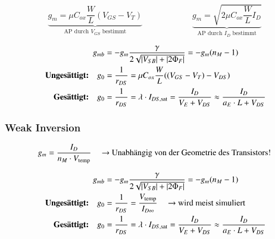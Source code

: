 \[
    \underbrace{ g_m = \mu C_{ox} \frac{W}{L} (V_{GS} - V_T) }_{\text{AP durch } V_{GS} \text{ bestimmt}} \qquad \qquad \qquad
    \underbrace{ g_m = \sqrt{2 \mu C_{ox} \frac{W}{L} I_D} }_{\text{AP durch } I_D \text{ bestimmt}} 
\]


\vspace{-0.15cm}

\begin{align*}
                                         g_{mb} &= -g_m \frac{\gamma}{2 \sqrt{\left|V_{SB}\right| + \left|2 \Phi_F\right|}} = - g_m (n_M - 1)                                     \\
    \text{ \textbf{Ungesättigt:}} \quad     g_0 &= \frac{1}{r_{DS}} = \mu C_{ox} \frac{W}{L} ((V_{GS} - V_T) - V_{DS})                                              \\
    \text{ \textbf{Gesättigt:}} \quad       g_0 &=  \frac{1}{r_{DS}} = \lambda \cdot I_{DS, \rm sat} = \frac{I_D}{V_E + V_{DS}} \approx \frac{I_D}{a_E \cdot L + V_{DS}}
\end{align*}


\subsubsection{Weak Inversion}

\vspace{-0.3cm}

\[
    g_m = \frac{I_D}{n_M \cdot V_\text{temp}} \quad \text{ \textrightarrow\ Unabhängig von der Geometrie des Transistors!}
\]


\vspace{-0.15cm}

\begin{align*}
                                         g_{mb} &= -g_m \frac{\gamma}{2 \sqrt{\abs{V_{SB}} + \abs{2 \Phi_F}}} = - g_m (n_M - 1)                                             \\
    \text{ \textbf{Ungesättigt:}} \quad     g_0 &= \frac{1}{r_{DS}} = \frac{V_{\text{temp}}}{I_{D \infty}} \quad \text{ \textrightarrow\ wird meist simuliert}              \\
    \text{ \textbf{Gesättigt:}} \quad       g_0 &=  \frac{1}{r_{DS}} = \lambda \cdot  I_{DS, \rm sat} = \frac{I_D}{V_E + V_{DS}}  \approx \frac{I_D}{a_E \cdot L + V_{DS}}
\end{align*}


